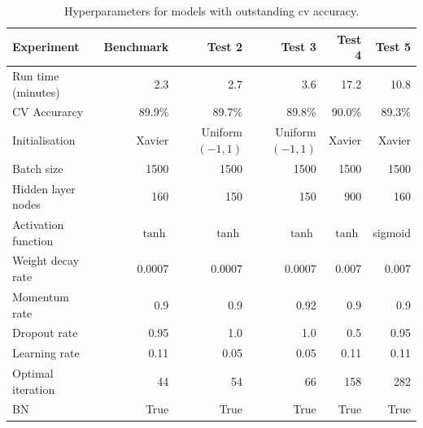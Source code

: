 \begin{table}
\caption{Hyperparameters for models with outstanding cv accuracy.\label{table:best-four-steps}}
\centering
{\footnotesize
\begin{tabular}{@{}lrrrrr@{}}
\toprule
Experiment                & Benchmark  & Test 2           & Test 3           & Test 4  & Test 5  \\ \midrule
Run time (minutes)             & 2.3     & 2.7              & 3.6              & 17.2    & 10.8    \\
CV Accurarcy                 & 89.9\%  & 89.7\%           & 89.8\%           & 90.0\%  & 89.3\%  \\
Initialisation            & Xavier  & \parbox[T]{1cm}{Uniform$(-1,1)$} 
& \parbox[T]{1cm}{Uniform$(-1,1)$} 
                                                                            & Xavier  & Xavier  \\
Batch size                & 1500    & 1500             & 1500             & 1500    & 1500    \\
Hidden layer nodes        & 160     & 150              & 150              & 900     & 160     \\
Activation function       & $\tanh$ & $\tanh$          & $\tanh$          & $\tanh$ & sigmoid \\
Weight decay rate         & 0.0007  & 0.0007           & 0.0007           & 0.007   & 0.007   \\
Momentum rate             & 0.9     & 0.9              & 0.92             & 0.9     & 0.9     \\
Dropout rate              & 0.95    & 1.0              & 1.0              & 0.5     & 0.95    \\
Learning rate             & 0.11    & 0.05             & 0.05             & 0.11    & 0.11    \\
Optimal iteration & 44      & 54               & 66               & 158     & 282     \\ 
BN & True      & True          & True          & True       & True          \\\bottomrule
\end{tabular}
}
\end{table}


